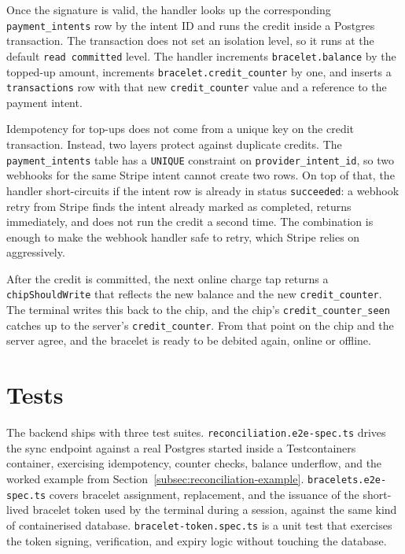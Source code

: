 Once the signature is valid, the handler looks up the corresponding \texttt{payment\_intents} row by the intent ID and runs the credit inside a Postgres transaction. The transaction does not set an isolation level, so it runs at the default \texttt{read committed} level. The handler increments \texttt{bracelet.balance} by the topped-up amount, increments \texttt{bracelet.credit\_counter} by one, and inserts a \texttt{transactions} row with that new \texttt{credit\_counter} value and a reference to the payment intent.

Idempotency for top-ups does not come from a unique key on the credit transaction. Instead, two layers protect against duplicate credits. The \texttt{payment\_intents} table has a \texttt{UNIQUE} constraint on \texttt{provider\_intent\_id}, so two webhooks for the same Stripe intent cannot create two rows. On top of that, the handler short-circuits if the intent row is already in status \texttt{succeeded}: a webhook retry from Stripe finds the intent already marked as completed, returns immediately, and does not run the credit a second time. The combination is enough to make the webhook handler safe to retry, which Stripe relies on aggressively.

After the credit is committed, the next online charge tap returns a \texttt{chipShouldWrite} that reflects the new balance and the new \texttt{credit\_counter}. The terminal writes this back to the chip, and the chip's \texttt{credit\_counter\_seen} catches up to the server's \texttt{credit\_counter}. From that point on the chip and the server agree, and the bracelet is ready to be debited again, online or offline.

\section{Tests}
\label{sec:impl-tests}

The backend ships with three test suites. \texttt{reconciliation.e2e-spec.ts} drives the sync endpoint against a real Postgres started inside a Testcontainers container, exercising idempotency, counter checks, balance underflow, and the worked example from Section~\ref{subsec:reconciliation-example}. \texttt{bracelets.e2e-spec.ts} covers bracelet assignment, replacement, and the issuance of the short-lived bracelet token used by the terminal during a session, against the same kind of containerised database. \texttt{bracelet-token.spec.ts} is a unit test that exercises the token signing, verification, and expiry logic without touching the database.
